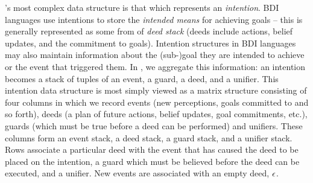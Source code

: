 \ail's most complex data structure is that which represents an
\emph{intention}.  BDI languages use intentions to
store the \emph{intended means} for achieving goals -- this is
generally represented as some from of {\em deed stack} (deeds include
actions, belief updates, and the commitment to
goals).  Intention structures in BDI languages may
also maintain information about the (sub-)goal they are intended to
achieve or the event that triggered them. In \ail, we aggregate
this information: an intention becomes a stack of tuples of an
event, a guard, a deed, and a
unifier.  This \ail{} intention data structure is most
simply viewed as a matrix structure consisting of four columns in
which we record events (new perceptions, goals committed to and so
forth), deeds (a plan of future actions, belief updates, goal
commitments, etc.), guards (which must be true before a deed can be
performed) and unifiers. These columns form an event stack, a deed
stack, a guard stack, and a unifier stack.  Rows associate a
particular deed with the event that has caused the deed to be placed
on the intention, a guard which must be believed before the deed can
be executed, and a unifier. New events are associated with an empty
deed, $\AILnpy$\index{$\AILnpy$}.

